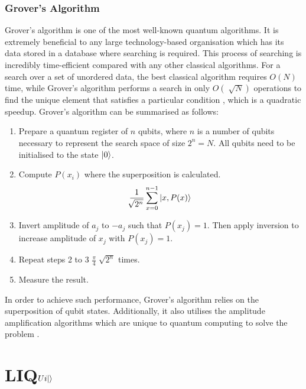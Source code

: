 \documentclass[12pt]{third-rep}
\begin{document}
\subsection{Grover's Algorithm}
Grover's algorithm is one of the most well-known quantum algorithms. It is extremely beneficial to any large technology-based organisation which has its data stored in a database where searching is required. This process of searching is incredibly time-efficient compared with any other classical algorithms. For a search over a set of unordered data, the best classical algorithm requires $O(N)$ time, while Grover's algorithm performs a search in only $O(\sqrt[]{N})$ operations to find the unique element that satisfies a particular condition \cite{umass}, which is a quadratic speedup. Grover's algorithm can be summarised as follows:
\begin{enumerate}
\item Prepare a quantum register of $n$ qubits, where $n$ is a number of qubits necessary to represent the search space of size $2^n=N$. All qubits need to be initialised to the state ${\left\vert{0}\right\rangle}$.
\item Compute $P(x_i)$ where the superposition is calculated.
$$\frac{1}{\sqrt[]{2^n}}\sum_{x=0}^{n-1}{\left\vert{x,P(x)}\right\rangle}$$
\item Invert amplitude of $a_j$ to $-a_j$ such that $P(x_j)=1$. Then apply inversion to increase amplitude of $x_j$ with $P(x_j)=1$.
\item Repeat steps 2 to 3 $\frac{\pi}{4}\sqrt[]{2^n}$ times.
\item Measure the result.
\end{enumerate}
In order to achieve such performance, Grover's algorithm relies on the superposition of qubit states. Additionally, it also utilises the amplitude amplification algorithms which are unique to quantum computing to solve the problem \cite{umass}.

\begingroup
\renewcommand{\cleardoublepage}{}
\renewcommand{\clearpage}{}
\chapter{LIQ$Ui{\left\vert{}\right\rangle}$}
\endgroup
\end{document}
